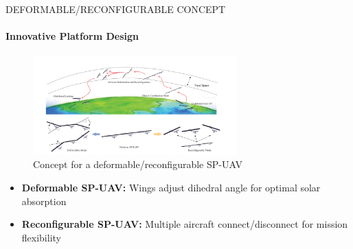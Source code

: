 \documentclass{beamer}
\begin{document}
\begin{frame}{DEFORMABLE/RECONFIGURABLE CONCEPT}
    \framesubtitle{Innovative Platform Design}
    \begin{figure}
        \centering
        \includegraphics[width=0.7\textwidth]{concept.png}
        \caption{Concept for a deformable/reconfigurable SP-UAV}
        \label{fig:deformable_concept}
    \end{figure}
    
    \begin{itemize}
        \item \textbf{Deformable SP-UAV:} Wings adjust dihedral angle for optimal solar absorption
        \item \textbf{Reconfigurable SP-UAV:} Multiple aircraft connect/disconnect for mission flexibility
    \end{itemize}
\end{frame}
\end{document}
